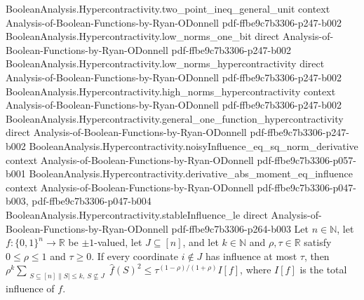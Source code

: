 \begin{lemma}
  {BooleanAnalysis.Hypercontractivity.two_point_ineq_general_unit}
  {context}
  {Analysis-of-Boolean-Functions-by-Ryan-ODonnell}
  {pdf-ffbe9c7b3306-p247-b002}
\proofstep
  {BooleanAnalysis.Hypercontractivity.low_norms_one_bit}
  {direct}
  {Analysis-of-Boolean-Functions-by-Ryan-ODonnell}
  {pdf-ffbe9c7b3306-p247-b002}
\proofstep
  {BooleanAnalysis.Hypercontractivity.low_norms_hypercontractivity}
  {direct}
  {Analysis-of-Boolean-Functions-by-Ryan-ODonnell}
  {pdf-ffbe9c7b3306-p247-b002}
\proofstep
  {BooleanAnalysis.Hypercontractivity.high_norms_hypercontractivity}
  {context}
  {Analysis-of-Boolean-Functions-by-Ryan-ODonnell}
  {pdf-ffbe9c7b3306-p247-b002}
\proofstep
  {BooleanAnalysis.Hypercontractivity.general_one_function_hypercontractivity}
  {direct}
  {Analysis-of-Boolean-Functions-by-Ryan-ODonnell}
  {pdf-ffbe9c7b3306-p247-b002}
\proofstep
  {BooleanAnalysis.Hypercontractivity.noisyInfluence_eq_sq_norm_derivative}
  {context}
  {Analysis-of-Boolean-Functions-by-Ryan-ODonnell}
  {pdf-ffbe9c7b3306-p057-b001}
\proofstep
  {BooleanAnalysis.Hypercontractivity.derivative_abs_moment_eq_influence}
  {context}
  {Analysis-of-Boolean-Functions-by-Ryan-ODonnell}
  {pdf-ffbe9c7b3306-p047-b003,
    pdf-ffbe9c7b3306-p047-b004}
\proofstep
  {BooleanAnalysis.Hypercontractivity.stableInfluence_le}
  {direct}
  {Analysis-of-Boolean-Functions-by-Ryan-ODonnell}
  {pdf-ffbe9c7b3306-p264-b003}
Let $n\in\mathbb N$, let $f:\{0,1\}^n\to\mathbb R$ be $\pm1$-valued, let
$J\subseteq[n]$, and let $k\in\mathbb N$ and $\rho,\tau\in\mathbb R$ satisfy
$0\le\rho\le1$ and $\tau\ge0$. If every coordinate $i\notin J$ has influence at most
$\tau$, then $\rho^k\sum_{\substack{S\subseteq[n]\|S|\le k,\ S\nsubseteq J}}\widehat
f(S)^2\le\tau^{(1-\rho)/(1+\rho)} I[f]$, where $I[f]$ is the total influence of $f$.
\end{lemma}

